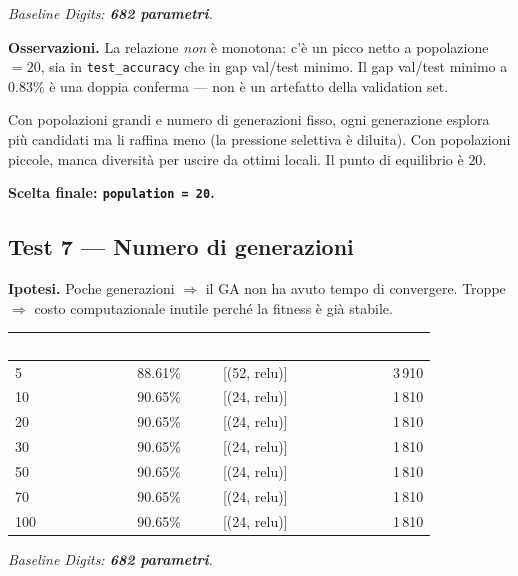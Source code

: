 \documentclass[11pt,a4paper]{article}
\newcommand{\fnt}{\texttt}     %
\begin{document}
\textit{Baseline Digits: \textbf{682 parametri}.}

\textbf{Osservazioni.}
La relazione \emph{non} è monotona: c'è un picco netto a popolazione
$=20$, sia in \texttt{test\_accuracy} che in gap val/test minimo. Il gap
val/test minimo a $0.83\%$ è una doppia conferma --- non è un artefatto
della validation set.

Con popolazioni grandi e numero di generazioni fisso, ogni generazione
esplora più candidati ma li raffina meno (la pressione selettiva è
diluita). Con popolazioni piccole, manca diversità per uscire da ottimi
locali. Il punto di equilibrio è $20$.

\textbf{Scelta finale: \fnt{population = 20}.}

\subsection{Test 7 — Numero di generazioni}

\textbf{Ipotesi.} Poche generazioni $\Rightarrow$ il GA non ha avuto
tempo di convergere. Troppe $\Rightarrow$ costo computazionale inutile
perché la fitness è già stabile.

\begin{center}
\begin{tabular}{lclr}
    \toprule
    \rowcolor{headerblue}
    \textcolor{white}{\textbf{generations}} &
    \textcolor{white}{\textbf{test\_accuracy}} &
    \textcolor{white}{\textbf{architettura}} &
    \textcolor{white}{\textbf{n\_params GA}} \\
    \midrule
    5    & 88.61\%  & [(52, relu)] & 3\,910 \\
    \rowcolor{rowgray}
    10   & 90.65\%  & [(24, relu)] & 1\,810 \\
    20   & 90.65\%  & [(24, relu)] & 1\,810 \\
    \rowcolor{rowgray}
    30   & 90.65\%  & [(24, relu)] & 1\,810 \\
    50   & 90.65\%  & [(24, relu)] & 1\,810 \\
    \rowcolor{rowgray}
    70   & 90.65\%  & [(24, relu)] & 1\,810 \\
    100  & 90.65\%  & [(24, relu)] & 1\,810 \\
    \bottomrule
\end{tabular}
\end{center}

\textit{Baseline Digits: \textbf{682 parametri}.}
\end{document}
